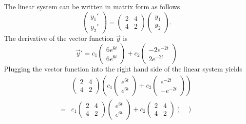 \begin{solution}
  The linear system can be written in matrix form as follows
  \[
  \begin{pmatrix}
    y_1' \\ y_2'
  \end{pmatrix} =
  \begin{pmatrix}
    2 & 4\\
    4 & 2 
  \end{pmatrix} 
  \begin{pmatrix}
    y_1 \\ y_2
  \end{pmatrix}.
  \]
  The derivative of the vector function $\vec{y}$ is
  \[
    \vec{y}'=
    c_1
    \begin{pmatrix}
      6e^{6t} \\ 6e^{6t}
    \end{pmatrix}
    + c_2
    \begin{pmatrix}
      -2e^{-2t} \\
      2e^{-2t}
    \end{pmatrix}
  \]
  Plugging the vector function into the right hand side of the linear system yields
  \[
    \begin{aligned}
      &\begin{pmatrix}
        2 & 4\\
        4 & 2 
      \end{pmatrix} \left(
        c_1
        \begin{pmatrix}
          e^{6t} \\ e^{6t}
        \end{pmatrix}
        +c_2
        \begin{pmatrix}
          e^{-2t} \\
          -e^{-2t}
        \end{pmatrix}
      \right)\\
      =&
        c_1
        \begin{pmatrix}
          2 & 4\\
          4 & 2 
        \end{pmatrix}
        \begin{pmatrix}
          e^{6t} \\ e^{6t}
        \end{pmatrix}
        +c_2
        \begin{pmatrix}
          2 & 4\\
          4 & 2 
        \end{pmatrix}
        \begin{pmatrix}

\end{pmatrix}
\end{aligned}\]
\end{solution}

